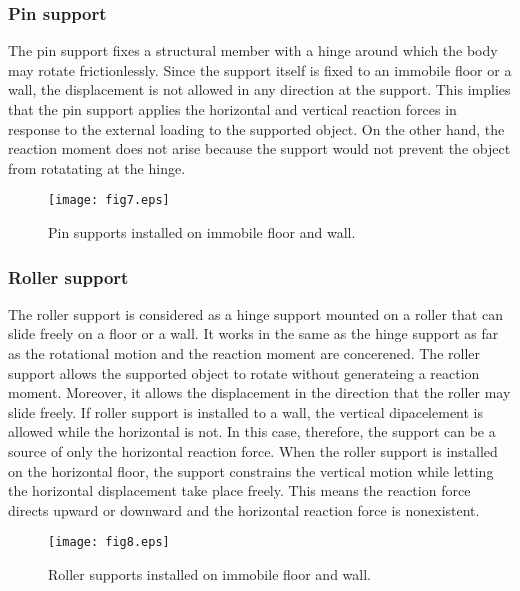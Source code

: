 \documentclass[10pt,a4j]{article}
\begin{document}
\subsubsection{Pin support}
The pin support fixes a structural member with a hinge around which the body may 
rotate frictionlessly. Since the support itself is fixed to an immobile floor 
or a wall, the displacement is not allowed in any direction at the support. 
This implies that the pin support applies the horizontal and vertical reaction 
forces in response to the external loading to the supported object. 
On the other hand, the reaction moment does not arise because the support would 
not prevent the object from rotatating at the hinge. 
\begin{figure}[h]
	\begin{center}
	\texttt{[image: fig7.eps]} 
	\end{center}
	\caption{Pin supports installed on immobile floor and wall.} 
	\label{fig:fig7}
\end{figure}
\subsubsection{Roller support}
The roller support is considered as a hinge support mounted on a roller 
that can slide freely on a floor or a wall. 
It works in the same as the hinge support as far as the rotational motion 
 and the reaction moment are concerened. The roller support allows the supported object 
 to rotate without generateing a reaction moment. Moreover, it allows the displacement 
 in the direction that the roller may slide freely. If roller support is installed to a wall, 
 the vertical dipacelement is allowed while the horizontal is not. 
 In this case, therefore, the support can be a source of only the horizontal reaction force.
When the roller support is installed on the horizontal floor, the support 
 constrains the vertical motion while letting the horizontal displacement take place freely. 
This means the reaction force directs upward or downward and the horizontal 
reaction force is nonexistent.
\begin{figure}[h]
	\begin{center}
	\texttt{[image: fig8.eps]} 
	\end{center}
	\caption{Roller supports installed on immobile floor and wall.} 
	\label{fig:fig8}
\end{figure}
\end{document}

